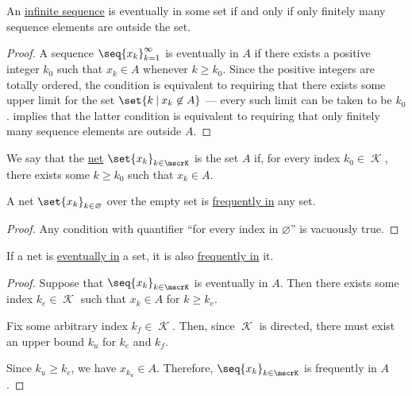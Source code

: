 \begin{proposition}\label{thm:sequence_eventally_in}
  An \hyperref[def:sequence]{infinite sequence} is eventually in some set if and only if only finitely many sequence elements are outside the set.
\end{proposition}
\begin{proof}
  A sequence \( \seq{ x_k }_{k=1}^\infty \) is eventually in \( A \) if there exists a positive integer \( k_0 \) such that \( x_k \in A \) whenever \( k \geq k_0 \). Since the positive integers are totally ordered, the condition is equivalent to requiring that there exists some upper limit for the set \( \set{ k \given x_k \not\in A } \) --- every such limit can be taken to be \( k_0 \).  implies that the latter condition is equivalent to requiring that only finitely many sequence elements are outside \( A \).
\end{proof}

\begin{definition}\label{def:net_frequently_in}
  We say that the \hyperref[def:topological_net]{net} \( \set{ x_k }_{k \in \mscrK} \) is  the set \( A \) if, for every index \( k_0 \in \mscrK \), there exists some \( k \geq k_0 \) such that \( x_k \in A \).
\end{definition}

\begin{proposition}\label{thm:empty_index_set_implies_frequently_in}
  A net \( \set{ x_k }_{k \in \varnothing} \) over the empty set is \hyperref[def:net_frequently_in]{frequently in} any set.
\end{proposition}
\begin{proof}
  Any condition with quantifier \enquote{for every index in \( \varnothing \)} is vacuously true.
\end{proof}

\begin{proposition}\label{thm:eventually_in_implies_frequently_in}
  If a net is \hyperref[def:net_eventually_in]{eventually in} a set, it is also \hyperref[def:net_frequently_in]{frequently in} it.
\end{proposition}
\begin{proof}
  Suppose that \( \seq{ x_k }_{k \in \mscrK} \) is eventually in \( A \). Then there exists some index \( k_e \in \mscrK \) such that \( x_k \in A \) for \( k \geq k_e \).

  Fix some arbitrary index \( k_f \in \mscrK \). Then, since \( \mscrK \) is directed, there must exist an upper bound \( k_u \) for \( k_e \) and \( k_f \).

  Since \( k_u \geq k_e \), we have \( x_{k_u} \in A \). Therefore, \( \seq{ x_k }_{k \in \mscrK} \) is frequently in \( A \).
\end{proof}

